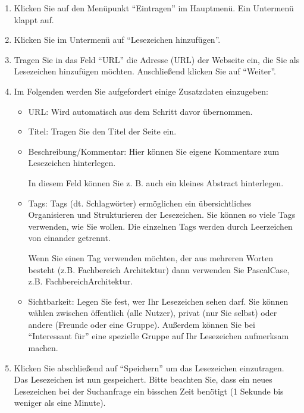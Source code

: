 \begin{enumerate}
    \item Klicken Sie auf den Menüpunkt \enquote{Eintragen} im Hauptmenü. Ein Untermenü klappt auf.
    \item Klicken Sie im Untermenü auf \enquote{Lesezeichen hinzufügen}.
    \item Tragen Sie in das Feld \enquote{URL} die Adresse (URL) der Webseite ein, die Sie als Lesezeichen hinzufügen möchten. Anschließend klicken Sie auf \enquote{Weiter}. 
    \item Im Folgenden werden Sie aufgefordert einige Zusatzdaten einzugeben:
    \begin{itemize}
        \item URL: Wird automatisch aus dem Schritt davor übernommen.
        \item Titel: Tragen Sie den Titel der Seite ein. 
        \item Beschreibung/Kommentar: Hier können Sie eigene Kommentare zum Lesezeichen hinterlegen. 
			\begin{mdframed}[style=mdfexample1,frametitle={TIPP},backgroundcolor=gray!40,linecolor=black]In diesem Feld können Sie z. B. auch ein kleines Abstract hinterlegen. 
			\end{mdframed}
        \item Tags: Tags (dt. Schlagwörter) ermöglichen ein übersichtliches Organisieren und Strukturieren der Lesezeichen. Sie können so viele Tags verwenden, wie Sie wollen. Die einzelnen Tags werden durch Leerzeichen von einander getrennt. \newline 
        	\begin{mdframed}[style=mdfexample1,frametitle={TIPP},backgroundcolor=gray!40]
	Wenn Sie einen Tag verwenden möchten, der aus mehreren Worten besteht (z.B. Fachbereich Architektur) dann verwenden Sie PascalCase, z.B. FachbereichArchitektur. 
			\end{mdframed}
        \item Sichtbarkeit: Legen Sie fest, wer Ihr Lesezeichen sehen darf. Sie können wählen zwischen öffentlich (alle Nutzer), privat (nur Sie selbst) oder andere (Freunde oder eine Gruppe). Außerdem können Sie bei \enquote{Interessant für} eine spezielle Gruppe auf Ihr Lesezeichen aufmerksam machen.  
    \end{itemize}
    \item Klicken Sie abschließend auf \enquote{Speichern} um das Lesezeichen einzutragen. Das Lesezeichen ist nun gespeichert. Bitte beachten Sie, dass ein neues Lesezeichen bei der Suchanfrage ein bisschen Zeit benötigt (1 Sekunde bis weniger als eine Minute). 
\end{enumerate}
